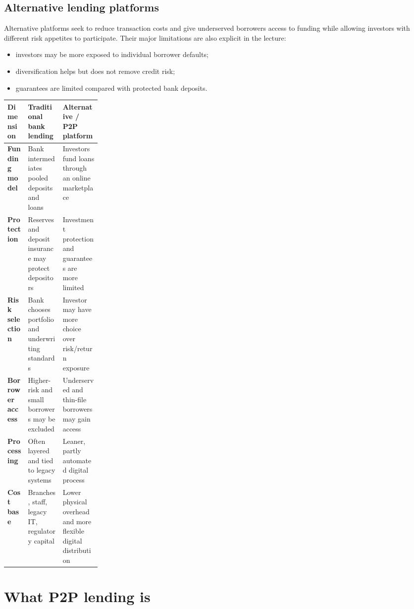 \subsection{Alternative lending platforms}

Alternative platforms seek to reduce transaction costs and give underserved borrowers access to funding while allowing investors with different risk appetites to participate. Their major limitations are also explicit in the lecture:

\begin{itemize}
  \item investors may be more exposed to individual borrower defaults;
  \item diversification helps but does not remove credit risk;
  \item guarantees are limited compared with protected bank deposits.
\end{itemize}

\begin{mltable}
\begin{tabularx}{\linewidth}{@{}>{\bfseries\color{MLNavy}}p{0.22\linewidth}XX@{}}
\toprule
\rowcolor{MLPaleBlue!92}
Dimension & Traditional bank lending & Alternative / P2P platform \\
\midrule
Funding model & Bank intermediates pooled deposits and loans & Investors fund loans through an online marketplace \\
Protection & Reserves and deposit insurance may protect depositors & Investment protection and guarantees are more limited \\
Risk selection & Bank chooses portfolio and underwriting standards & Investor may have more choice over risk/return exposure \\
Borrower access & Higher-risk and small borrowers may be excluded & Underserved and thin-file borrowers may gain access \\
Processing & Often layered and tied to legacy systems & Leaner, partly automated digital process \\
Cost base & Branches, staff, legacy IT, regulatory capital & Lower physical overhead and more flexible digital distribution \\
\bottomrule
\end{tabularx}
\end{mltable}

\section{What P2P lending is}

